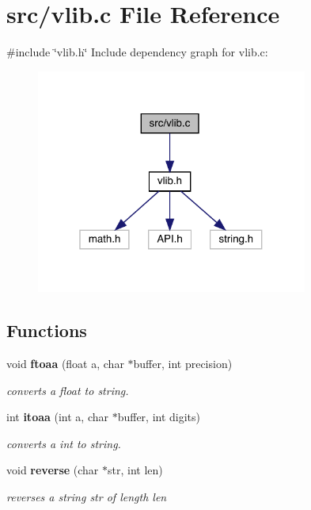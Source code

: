 \section{src/vlib.c File Reference}
\label{vlib_8c}
{\ttfamily \#include \char`\"{}vlib.\+h\char`\"{}}\newline
Include dependency graph for vlib.\+c\+:
\nopagebreak
\begin{figure}[H]
\begin{center}
\leavevmode
\includegraphics[width=253pt]{vlib_8c__incl}
\end{center}
\end{figure}
\subsection*{Functions}
\begin{DoxyCompactItemize}
\item 
void \textbf{ ftoaa} (float a, char $\ast$buffer, int precision)
\begin{DoxyCompactList}\small\item\em converts a float to string. \end{DoxyCompactList}\item 
int \textbf{ itoaa} (int a, char $\ast$buffer, int digits)
\begin{DoxyCompactList}\small\item\em converts a int to string. \end{DoxyCompactList}\item 
void \textbf{ reverse} (char $\ast$str, int len)
\begin{DoxyCompactList}\small\item\em reverses a string \textquotesingle{}str\textquotesingle{} of length \textquotesingle{}len\textquotesingle{} \end{DoxyCompactList}\end{DoxyCompactItemize}


